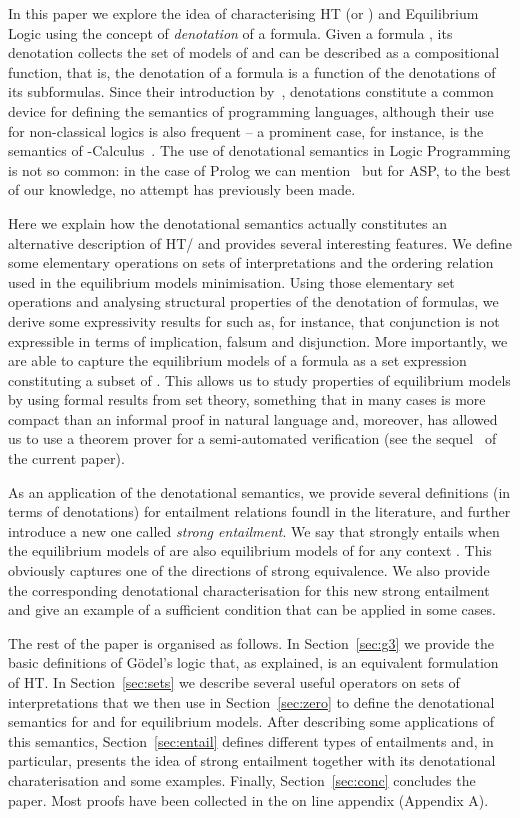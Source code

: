 \documentclass{tlp}
\begin{document}
In this paper we explore the idea of characterising HT (or ) and Equilibrium Logic using the concept of \emph{denotation} of a formula. Given a formula , its denotation  collects the set of  models of  and can be described as a compositional function, that is, the denotation of a formula is a function of the denotations of its subformulas. Since their introduction by~\cite{SS71}, denotations constitute a common device for defining the semantics of programming languages, although their use for non-classical logics is also frequent -- a prominent case, for instance, is the semantics of -Calculus~\cite{Koz83}. The use of denotational semantics in Logic Programming is not so common: in the case of Prolog we can mention~\cite{NF89} but for ASP, to the best of our knowledge, no attempt has previously been made.

Here we explain how the denotational semantics actually constitutes an alternative description of HT/ and provides several interesting features. We define some elementary operations on sets of interpretations and the ordering relation used in the equilibrium models minimisation. Using those elementary set operations and analysing structural properties of the denotation of formulas, we derive some expressivity results for  such as, for instance, that conjunction is not expressible in terms of implication, falsum and disjunction. More importantly, we are able to capture the equilibrium models of a formula as a set expression constituting a subset of . This allows us to study properties of equilibrium models by using formal results from set theory, something that in many cases is more compact than an informal proof in natural language and, moreover, has allowed us to use a theorem prover for a semi-automated verification (see the sequel~\cite{CMMSE15} of the current paper).

As an application of the denotational semantics, we provide several definitions (in terms of denotations) for entailment relations foundl in the literature, and further introduce a new one called \emph{strong entailment}. We say that  strongly entails  when the equilibrium models of  are also equilibrium models of  for any context . This obviously captures one of the directions of strong equivalence. We also provide the corresponding denotational characterisation for this new strong entailment and give an example of a sufficient condition that can be applied in some cases.

The rest of the paper is organised as follows. In Section~\ref{sec:g3} we provide the basic definitions of G\"odel's  logic that, as explained, is an equivalent formulation of HT. In Section~\ref{sec:sets} we describe several useful operators on sets of interpretations that we then use in Section~\ref{sec:zero} to define the denotational semantics for  and for equilibrium models. After describing some applications of this semantics, Section~\ref{sec:entail} defines different types of entailments and, in particular, presents the idea of strong entailment together with its denotational charaterisation and some examples. Finally, Section~\ref{sec:conc} concludes the paper. Most proofs have been collected in the on line appendix (Appendix A).
\end{document}
